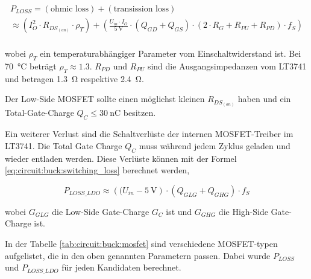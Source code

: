 \begin{multline}
    P_{LOSS} = (\textrm{ohmic loss}) + (\textrm{transission loss}) \\
             \approx \left( I_O^2 \cdot R_{DS_{(on)}} \cdot \rho_T \right)
                    + \left( \frac{U_{in} \cdot I_O}{\SI{5}{\volt}} \cdot \left(Q_{GD} + Q_{GS} \right) \cdot \left( 2 \cdot R_G + R_{PU} + R_{PD} \right) \cdot f_S \right) \\
    \label{eq:circuit:buck:mosfet_ploss}
\end{multline}

wobei $\rho_T$ ein temperaturabh\"angiger Parameter vom Einschaltwiderstand ist.
Bei \SI{70}{\celsius} betr\"agt $\rho_T \approx 1.3$. $R_{PD}$ und $R_{PU}$ sind
die  Ausgangsimpedanzen  vom  LT3741  und  betragen  \SI{1.3}{\ohm}   respektive
\SI{2.4}{\ohm}.

Der  Low-Side MOSFET sollte einen m\"oglichst kleinen $R_{DS_{(on)}}$ haben  und
ein    Total-Gate-Charge    $Q_C    \leq    \SI{30}{\nano\coulomb}$    besitzen.

Ein  weiterer Verlust sind die Schaltverl\"uste der internen  MOSFET-Treiber  im
LT3741. Die Total Gate Charge $Q_C$ muss  w\"ahrend  jedem  Zyklus  geladen  und
wieder   entladen   werden.   Diese   Verl\"uste   k\"onnen   mit   der   Formel
\ref{eq:circuit:buck:switching_loss} berechnet werden,

\begin{equation}
    P_{LOSS\_LDO} \approx \left( (U_{in} - \SI{5}{\volt} \right) \cdot \left( Q_{GLG} + Q_{GHG} \right) \cdot f_S
    \label{eq:circuit:buck:switching_loss}
\end{equation}

wobei $G_{GLG}$ die  Low-Side  Gate-Charge $G_C$ ist und $G_{GHG}$ die High-Side
Gate-Charge ist.

In  der  Tabelle  \ref{tab:circuit:buck:mosfet}  sind  verschiedene MOSFET-typen
aufgelistet, die in den oben genannten Parametern passen. Dabei wurde $P_{LOSS}$
und $P_{LOSS\_LDO}$ f\"ur jeden Kandidaten berechnet.

